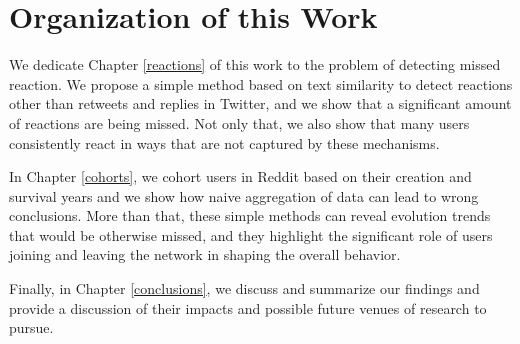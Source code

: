\section{Organization of this Work}

We dedicate Chapter \ref{reactions} of this work to the problem of detecting missed reaction. We propose a simple method based on text similarity to detect reactions other than retweets and replies in Twitter, and we show that a significant amount of reactions are being missed. Not only that, we also show that many users consistently react in ways that are not captured by these mechanisms.

In Chapter \ref{cohorts}, we cohort users in Reddit based on their creation and survival years and we show how naive aggregation of data can lead to wrong conclusions. More than that, these simple methods can reveal evolution trends that would be otherwise missed, and they highlight the significant role of users joining and leaving the network in shaping the overall behavior.

Finally, in Chapter \ref{conclusions}, we discuss and summarize our findings and provide a discussion of their impacts and possible future venues of research to pursue.